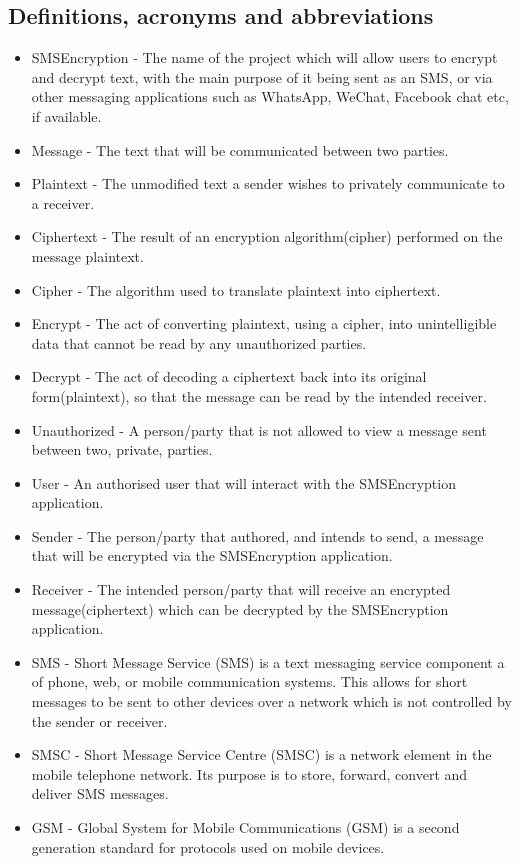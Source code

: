 \subsection{Definitions, acronyms and abbreviations}
\begin{itemize}
\item SMSEncryption - The name of the project which will allow users to encrypt and decrypt text, with the main purpose of it being sent as an SMS, or via other messaging applications such as WhatsApp, WeChat, Facebook chat etc, if available.
\item Message - The text that will be communicated between two parties.
\item Plaintext -  The unmodified text a sender wishes to privately communicate to a receiver. 
\item Ciphertext - The result of an encryption algorithm(cipher) performed on the message plaintext.
\item Cipher - The algorithm used to translate plaintext into ciphertext.
\item Encrypt -  The act of converting plaintext, using a cipher, into unintelligible data that cannot be read by any unauthorized parties.
\item Decrypt - The act of decoding a ciphertext back into its original form(plaintext), so that the message can be read by the intended receiver.
\item Unauthorized - A person/party that is not allowed to view a message sent between two, private, parties.
\item User - An authorised user that will interact with the SMSEncryption application.
\item Sender - The person/party that authored, and intends to send, a message that will be encrypted via the SMSEncryption application.
\item Receiver - The intended person/party that will receive an encrypted message(ciphertext) which can be decrypted by the SMSEncryption application.
\item SMS - Short Message Service (SMS) is a text messaging service component a of phone, web, or mobile communication systems. This allows for short messages to be sent to other devices over a network which is not controlled by the sender or receiver.
\item SMSC - Short Message Service Centre (SMSC) is a network element in the mobile telephone network. Its purpose is to store, forward, convert and deliver SMS messages.
\item GSM - Global System for Mobile Communications (GSM) is a second generation standard for protocols used on mobile devices.

\end{itemize}

